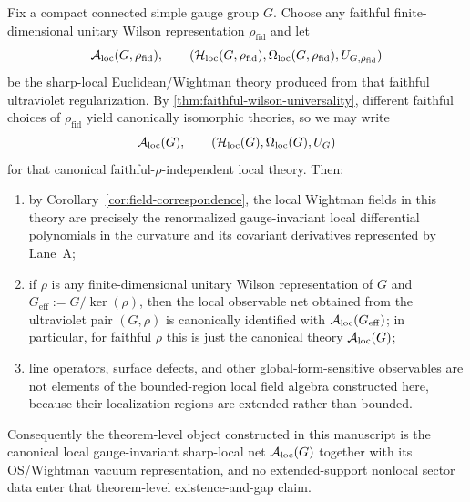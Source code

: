 \begin{theorem}\label{thm:exact-local-net-endpoint}
Fix a compact connected simple gauge group $G$. Choose any faithful finite-dimensional unitary Wilson representation $\rho_{\mathrm{fid}}$ and let
\[
\mathcal{A}_{\mathrm{loc}}(G,\rho_{\mathrm{fid}}),\qquad (\mathcal H_{\mathrm{loc}}(G,\rho_{\mathrm{fid}}),\Omega_{\mathrm{loc}}(G,\rho_{\mathrm{fid}}),U_{G,\rho_{\mathrm{fid}}})
\]
be the sharp-local Euclidean/Wightman theory produced from that faithful ultraviolet regularization. By \cref{thm:faithful-wilson-universality}, different faithful choices of $\rho_{\mathrm{fid}}$ yield canonically isomorphic theories, so we may write
\[
\mathcal{A}_{\mathrm{loc}}(G),\qquad (\mathcal H_{\mathrm{loc}}(G),\Omega_{\mathrm{loc}}(G),U_G)
\]
for that canonical faithful-$\rho$-independent local theory. Then:
\begin{enumerate}[label=\textup{(\roman*)},leftmargin=2.25em]
\item by Corollary~\ref{cor:field-correspondence}, the local Wightman fields in this theory are precisely the renormalized gauge-invariant local differential polynomials in the curvature and its covariant derivatives represented by Lane~A;
\item if $\rho$ is any finite-dimensional unitary Wilson representation of $G$ and $G_{\mathrm{eff}}:=G/\ker(\rho)$, then the local observable net obtained from the ultraviolet pair $(G,\rho)$ is canonically identified with $\mathcal{A}_{\mathrm{loc}}(G_{\mathrm{eff}})$; in particular, for faithful $\rho$ this is just the canonical theory $\mathcal{A}_{\mathrm{loc}}(G)$;
\item line operators, surface defects, and other global-form-sensitive observables are not elements of the bounded-region local field algebra constructed here, because their localization regions are extended rather than bounded.
\end{enumerate}
Consequently the theorem-level object constructed in this manuscript is the canonical local gauge-invariant sharp-local net $\mathcal{A}_{\mathrm{loc}}(G)$ together with its OS/Wightman vacuum representation, and no extended-support nonlocal sector data enter that theorem-level existence-and-gap claim.
\end{theorem}


